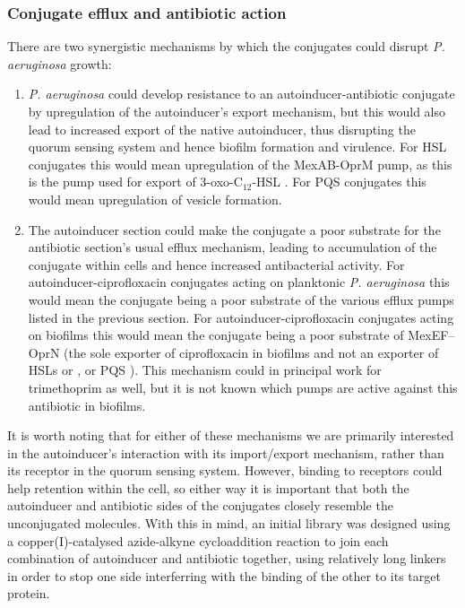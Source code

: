 \subsubsection{Conjugate efflux and antibiotic action\label{sec:conj_eff}}

There are two synergistic mechanisms by which the conjugates could disrupt \textit{P. aeruginosa} growth:

\begin{enumerate}

\item \textit{P. aeruginosa} could develop resistance to an autoinducer-antibiotic conjugate by upregulation of the autoinducer's export mechanism, but this would also lead to increased export of the native autoinducer, thus disrupting the quorum sensing system and hence biofilm formation and virulence\cite{Dubern2008,Davies1998,Evans1998}.
For HSL conjugates this would mean upregulation of the MexAB-OprM pump, as this is the pump used for export of 3-oxo-C$_{12}$-HSL \cite{Evans1998,Poole2004}.
For PQS conjugates this would mean upregulation of vesicle formation\cite{Florez2017}.

\item The autoinducer section could make the conjugate a poor substrate for the antibiotic section's usual efflux mechanism, leading to accumulation of the conjugate within cells and hence increased antibacterial activity. 
For autoinducer-ciprofloxacin conjugates acting on planktonic \textit{P. aeruginosa} this would mean the conjugate being a poor substrate of the various efflux pumps listed in the previous section.
For autoinducer-ciprofloxacin conjugates acting on biofilms this would mean the conjugate being a poor substrate of MexEF–OprN (the sole exporter of ciprofloxacin  in biofilms\cite{DeKievit2001} and not an exporter of HSLs  or , or PQS \cite{Poole2004}).
This mechanism could in principal work for trimethoprim  as well, but it is not known which pumps are active against this antibiotic in biofilms. 

\end{enumerate}

It is worth noting that for either of these mechanisms we are primarily interested in the autoinducer's interaction with its import/export mechanism, rather than its receptor in the quorum sensing system. However, binding to receptors could help retention within the cell, so either way it is important that both the autoinducer and antibiotic sides of the conjugates closely resemble the unconjugated molecules. With this in mind, an initial library was designed using a copper(I)-catalysed azide-alkyne cycloaddition reaction\cite{Tornoe2002,Rostovtsev2002} to join each combination of autoinducer and antibiotic together, using relatively long linkers in order to stop one side interferring with the binding of the other to its target protein.



